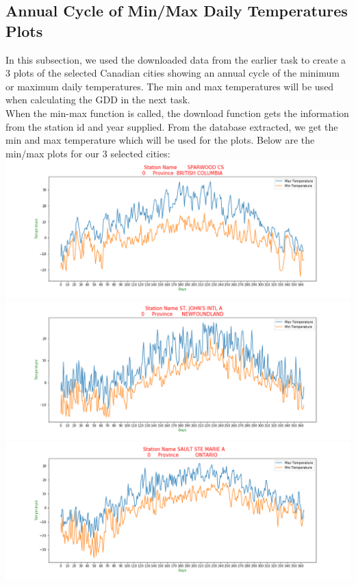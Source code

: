 \subsection{Annual Cycle of Min/Max Daily Temperatures Plots }
In this subsection, we used the downloaded data from the earlier task to create a 3 plots of the selected Canadian cities showing an annual cycle of the minimum or maximum daily temperatures. The min and max temperatures will be used when calculating the GDD in the next task. \\
When the min-max function is called, the download function gets the information from the station id and year supplied. From the database extracted, we get the min and max temperature  which will be used for the plots. 
Below are the min/max plots for our 3 selected cities:\\


\includegraphics[scale=0.35]{Fig_6842_2015.png}\\

\includegraphics[scale=0.35]{Fig_50089_2015.png}\\

\includegraphics[scale=0.35]{Fig_50092_2015.png}

